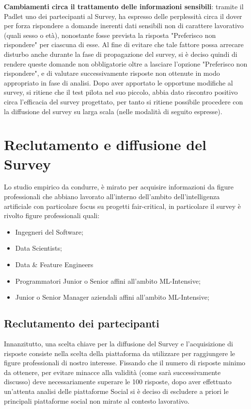   \textbf{Cambiamenti circa il trattamento delle informazioni sensibili}: 
   tramite il Padlet uno dei partecipanti al Survey, ha espresso delle perplessità circa il dover per forza rispondere a domande inerenti dati sensibili non di carattere lavorativo (quali sesso o età), nonostante fosse prevista la risposta "Preferisco non rispondere" per ciascuna di esse.  Al fine di evitare che tale fattore possa arrecare disturbo anche durante la fase di propagazione del survey, si è deciso quindi di rendere queste domande non obbligatorie oltre a lasciare l'opzione "Preferisco non rispondere", e di valutare successivamente risposte non ottenute in modo appropriato in fase di analisi. Dopo aver apportato le opportune modifiche al survey, si ritiene che il test pilota nel suo piccolo, abbia dato riscontro positivo circa l'efficacia del survey progettato, per tanto si ritiene possibile procedere con la diffusione del survey su larga scala (nelle modalità di seguito espresse).
    
    
    
    \section{Reclutamento e diffusione del Survey}
    
    Lo studio empirico da condurre, è mirato per acquisire informazioni da figure professionali che abbiano lavorato all'interno dell'ambito dell'intelligenza artificiale con particolare focus su progetti fair-critical, in particolare il survey è rivolto figure professionali quali:
    
        \begin{itemize}
            \item Ingegneri del Software;
            \item Data Scientists;
            \item Data \& Feature Engineers
            \item Programmatori Junior o Senior affini all'ambito ML-Intensive;
            \item Junior o Senior Manager aziendali affini all'ambito ML-Intensive;
        \end{itemize}
        
    \subsection{Reclutamento dei partecipanti}
    
    Innanzitutto, una scelta chiave per la diffusione del Survey e l'acquisizione di risposte consiste nella scelta della piattaforma da utilizzare per raggiungere le figure professionali di nostro interesse. Fissando che il numero di risposte minimo da ottenere, per evitare minacce alla validità (come sarà successivamente discusso) deve necessariamente superare le 100 risposte, dopo aver effettuato un'attenta analisi delle piattaforme Social si è deciso di escludere a priori le principali piattaforme social non mirate al contesto lavorativo. 
    

